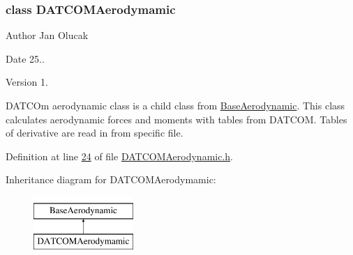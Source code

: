 \subsubsection{class D\+A\+T\+C\+O\+M\+Aerodymamic}
\begin{DoxyAuthor}{Author}
Jan Olucak 
\end{DoxyAuthor}
\begin{DoxyDate}{Date}
25.. 
\end{DoxyDate}
\begin{DoxyVersion}{Version}
1.
\end{DoxyVersion}
D\+A\+T\+C\+Om aerodynamic class is a child class from \hyperlink{group___aerodynamic_class_base_aerodynamic}{Base\+Aerodynamic}. This class calculates aerodynamic forces and moments with tables from D\+A\+T\+C\+OM. Tables of derivative are read in from specific file. 

Definition at line \hyperlink{_d_a_t_c_o_m_aerodynamic_8h_source_l00024}{24} of file \hyperlink{_d_a_t_c_o_m_aerodynamic_8h_source}{D\+A\+T\+C\+O\+M\+Aerodynamic.\+h}.

Inheritance diagram for D\+A\+T\+C\+O\+M\+Aerodymamic\+:\begin{figure}[H]
\begin{center}
\leavevmode
\includegraphics[height=2.000000cm]{group___aerodynamic}
\end{center}
\end{figure}
